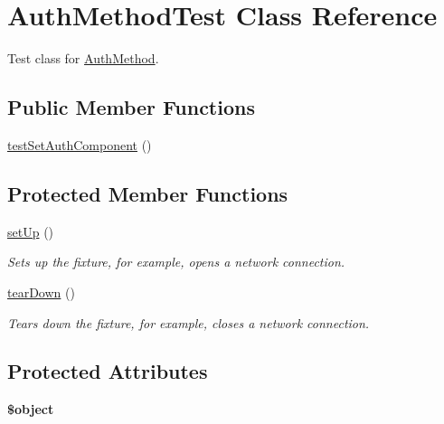 \hypertarget{class_auth_method_test}{
\section{AuthMethodTest Class Reference}
\label{class_auth_method_test}
}


Test class for \hyperlink{class_auth_method}{AuthMethod}.  


\subsection*{Public Member Functions}
\begin{DoxyCompactItemize}
\item 
\hyperlink{class_auth_method_test_acfb4c4ea0e45403fd0244fd88c0339a9}{testSetAuthComponent} ()
\end{DoxyCompactItemize}
\subsection*{Protected Member Functions}
\begin{DoxyCompactItemize}
\item 
\hyperlink{class_auth_method_test_afd541a067f07e2717d1ab702d9e1d14f}{setUp} ()
\begin{DoxyCompactList}\small\item\em Sets up the fixture, for example, opens a network connection. \item\end{DoxyCompactList}\item 
\hyperlink{class_auth_method_test_ab9726d10623fe83b695743e11fb7f407}{tearDown} ()
\begin{DoxyCompactList}\small\item\em Tears down the fixture, for example, closes a network connection. \item\end{DoxyCompactList}\end{DoxyCompactItemize}
\subsection*{Protected Attributes}
\begin{DoxyCompactItemize}
\item 
\hypertarget{class_auth_method_test_a782328e0260150dc4f2a9a670c7b4588}{
{\bfseries \$object}}
\label{class_auth_method_test_a782328e0260150dc4f2a9a670c7b4588}

\end{DoxyCompactItemize}


